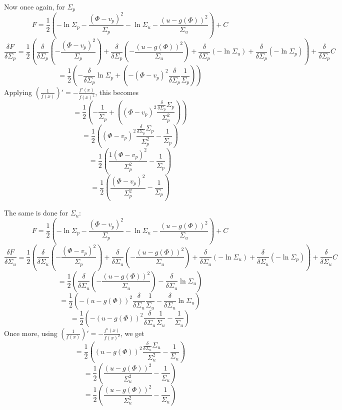 Now once again, for $\Sigma_p$
$$ F = \frac{1}{2} \left( - \ln \Sigma_p - \frac{(\Phi - v_p)^2}{\Sigma_p}  - \ln \Sigma_u - \frac{(u - g(\Phi))^2}{\Sigma_u}\right) + C$$
$$  \frac{\delta F }{\delta \Sigma_p} = 
\frac{1}{2} \left(
\frac{\delta}{\delta \Sigma_p} \left( - \frac{(\Phi - v_p)^2}{\Sigma_p} \right) +
\frac{\delta}{\delta \Sigma_p} \left( - \frac{(u - g(\Phi))^2}{\Sigma_u} \right) +
\frac{\delta}{\delta \Sigma_p} \left( - \ln \Sigma_u  \right) + 
\frac{\delta}{\delta \Sigma_p} \left( - \ln \Sigma_p  \right)  
\right) +
\frac{\delta}{\delta \Sigma_p} C
$$
$$  = 
\frac{1}{2} \left(
- \frac{\delta}{\delta \Sigma_p} \ln \Sigma_p +
\left( - (\Phi - v_p)^2
\frac{\delta}{\delta \Sigma_p} \frac{1}{\Sigma_p} \right) 
\right)
$$
Applying $ \left(\frac{1}{f(x)}\right)' = - \frac{f'(x)}{f(x)^2} $, this becomes 
$$  = 
\frac{1}{2} \left(
- \frac{1}{\Sigma_p} +
\left(  (\Phi - v_p)^2
\frac{\frac{\delta}{\delta \Sigma_p} \Sigma_p}{\Sigma_p^2} \right) 
\right)
$$
$$  = 
\frac{1}{2} \left(
(\Phi - v_p)^2
\frac{\frac{\delta}{\delta \Sigma_p} \Sigma_p}{\Sigma_p^2} 
- \frac{1}{\Sigma_p}
\right)
$$
$$  = 
\frac{1}{2} \left(
\frac{1(\Phi - v_p)^2}{\Sigma_p^2} 
- \frac{1}{\Sigma_p}
\right)
$$
$$  = 
\frac{1}{2} \left(
\frac{(\Phi - v_p)^2}{\Sigma_p^2} 
- \frac{1}{\Sigma_p}
\right)
$$

The same is done for $\Sigma_u$: 
$$ F = \frac{1}{2} \left( - \ln \Sigma_p - \frac{(\Phi - v_p)^2}{\Sigma_p}  - \ln \Sigma_u - \frac{(u - g(\Phi))^2}{\Sigma_u}\right) + C$$
$$  \frac{\delta F }{\delta \Sigma_u} = 
\frac{1}{2} \left(
\frac{\delta}{\delta \Sigma_u} \left( - \frac{(\Phi - v_p)^2}{\Sigma_p} \right) +
\frac{\delta}{\delta \Sigma_u} \left( - \frac{(u - g(\Phi))^2}{\Sigma_u} \right) +
\frac{\delta}{\delta \Sigma_u} \left( - \ln \Sigma_u  \right) + 
\frac{\delta}{\delta \Sigma_u} \left( - \ln \Sigma_p  \right)  
\right) +
\frac{\delta}{\delta \Sigma_u} C
$$
$$  = 
\frac{1}{2} \left(
\frac{\delta}{\delta \Sigma_u} \left( - \frac{(u - g(\Phi))^2}{\Sigma_u} \right) -
\frac{\delta}{\delta \Sigma_u}   \ln \Sigma_u   
\right)
$$
$$  = 
\frac{1}{2} \left(
-(u - g(\Phi))^2 \frac{\delta}{\delta \Sigma_u}\frac{1}{\Sigma_u} -
\frac{\delta}{\delta \Sigma_u}   \ln \Sigma_u   
\right)
$$
$$  = 
\frac{1}{2} \left(
-(u - g(\Phi))^2 \frac{\delta}{\delta \Sigma_u}\frac{1}{\Sigma_u} -
\frac{1}{ \Sigma_u}
\right)
$$
Once more, using $ \left(\frac{1}{f(x)}\right)' = - \frac{f'(x)}{f(x)^2} $, we get
$$  = 
\frac{1}{2} \left(
(u - g(\Phi))^2 \frac{\frac{\delta}{\delta \Sigma_u} \Sigma_u}{\Sigma_u^2} -
\frac{1}{ \Sigma_u}
\right)
$$
$$  = 
\frac{1}{2} \left(
 \frac{(u - g(\Phi))^2}{\Sigma_u^2} -
\frac{1}{ \Sigma_u}
\right)
$$
$$  = 
\frac{1}{2} \left(
\frac{(u - g(\Phi))^2}{\Sigma_u^2} -
\frac{1}{ \Sigma_u}
\right)
$$

